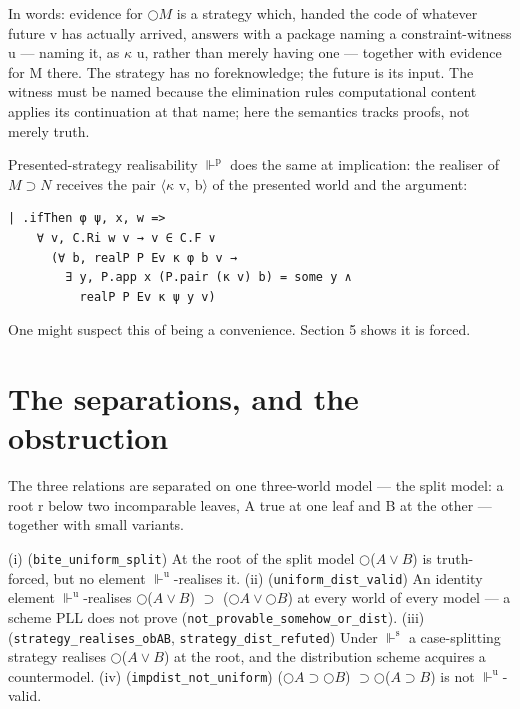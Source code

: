 In words: evidence for \ensuremath{\bigcirc M} is a strategy which, handed the code of
whatever future v has actually arrived, answers with a package naming a
constraint-witness u --- naming it, as \ensuremath{\kappa} u, rather than merely having
one --- together with evidence for M there. The strategy has no
foreknowledge; the future is its input. The witness must be named
because the elimination rule\textquotesingle s computational content applies its
continuation at that name; here the semantics tracks proofs, not merely
truth.

Presented-strategy realisability \ensuremath{\Vdash^{\mathrm{p}}} does the same at
implication: the realiser of \ensuremath{M \supset N} receives the pair \ensuremath{\langle\kappa} v, b\ensuremath{\rangle} of the
presented world and the argument:

\begin{lstlisting}
| .ifThen φ ψ, x, w =>
    ∀ v, C.Ri w v → v ∈ C.F ∨
      (∀ b, realP P Ev κ φ b v →
        ∃ y, P.app x (P.pair (κ v) b) = some y ∧
          realP P Ev κ ψ y v)
\end{lstlisting}

One might suspect this of being a convenience. Section 5 shows it is
forced.

\section{The separations, and the obstruction}\label{5-the-separations-and-the-obstruction}

The three relations are separated on one three-world model --- the split
model: a root r below two incomparable leaves, A true at one leaf and B
at the other --- together with small variants.

\begin{theorem}\label{thm:separations}
(i) (\texttt{bite\_uniform\_split}) At the root of the split
model \ensuremath{\bigcirc}(\ensuremath{A \vee B}) is truth-forced, but no element \ensuremath{\Vdash^{\mathrm{u}}}-realises it.
(ii) (\texttt{uniform\_dist\_valid}) An identity element \ensuremath{\Vdash^{\mathrm{u}}}-realises
\ensuremath{\bigcirc}(\ensuremath{A \vee B}) \ensuremath{\supset} (\ensuremath{\bigcirc A \vee \bigcirc B}) at every world of every model --- a
scheme PLL does not prove (\texttt{not\_provable\_somehow\_or\_dist}).
(iii) (\texttt{strategy\_realises\_obAB}, \texttt{strategy\_dist\_refuted})
Under \ensuremath{\Vdash^{\mathrm{s}}} a case-splitting strategy realises \ensuremath{\bigcirc}(\ensuremath{A \vee B}) at the
root, and the distribution scheme acquires a countermodel.
(iv) (\texttt{impdist\_not\_uniform})
(\ensuremath{\bigcirc A \supset \bigcirc B}) \ensuremath{\supset \bigcirc}(\ensuremath{A \supset B}) is not \ensuremath{\Vdash^{\mathrm{u}}}-valid.
\end{theorem}


